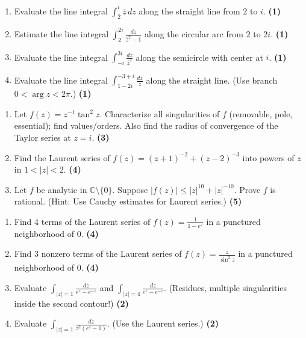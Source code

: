 \documentclass[12pt]{article}
\theoremstyle{definition} %
\theoremstyle{plain} %
\begin{document}
\begin{enumerate}
    \item Evaluate the line integral $\displaystyle \int_{2}^{i} \overline{z}\,dz$ along the straight line from $2$ to $i$. \quad \textbf{(1)}
    \item Estimate the line integral $\displaystyle \int_{2}^{2i} \frac{dz}{\overline{z}^2 - 1}$ along the circular arc from $2$ to $2i$. \quad \textbf{(1)}
    \item Evaluate the line integral $\displaystyle \int_{-i}^{3i} \frac{dz}{\overline{z}^2}$ along the semicircle with center at $i$. \quad \textbf{(1)}
    \item Evaluate the line integral $\displaystyle \int_{1 - 2i}^{-3 + i} \frac{dz}{z}$ along the straight line. (Use branch $0<\arg z<2\pi$.) \quad \textbf{(1)}
\end{enumerate}

\begin{enumerate}
    \item Let $f(z) = z^{-1} \tan^2 z$. Characterize all singularities of $f$ (removable, pole, essential); find values/orders. Also find the radius of convergence of the Taylor series at $z=i$. \quad \textbf{(3)}
    \setcounter{enumi}{2}
    \item Find the Laurent series of $f(z) = (z+1)^{-2} + (z-2)^{-3}$ into powers of $z$ in $1<|z|<2$. \quad \textbf{(4)}
    \item Let $f$ be analytic in $\mathbb{C}\setminus\{0\}$. Suppose $|f(z)| \le |z|^{10} + |z|^{-10}$. Prove $f$ is rational. (Hint: Use Cauchy estimates for Laurent series.) \quad \textbf{(5)}
\end{enumerate}

\begin{enumerate}
    \item Find 4 terms of the Laurent series of $\displaystyle f(z) = \frac{1}{1 - e^z}$ in a punctured neighborhood of $0$. \quad \textbf{(4)}
    \item Find 3 nonzero terms of the Laurent series of $\displaystyle f(z) = \frac{z}{\sin^2 z}$ in a punctured neighborhood of $0$. \quad \textbf{(4)}
    \item Evaluate $\displaystyle \int_{|z|=1} \frac{dz}{e^z - e^{-z}}$ and $\int_{|z|=4} \frac{dz}{e^z - e^{-z}}.$ (Residues, multiple singularities inside the second contour!) \quad \textbf{(2)}
    \item Evaluate $\displaystyle \int_{|z|=1} \frac{dz}{z^2 (e^z - 1)}.$ (Use the Laurent series.) \quad \textbf{(2)}
\end{enumerate}
\end{document}
